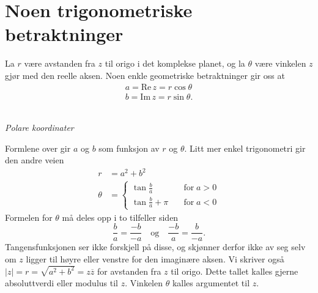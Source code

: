 \section*{Noen trigonometriske betraktninger}
La $r$ være avstanden fra $z$ til origo i det komplekse planet, og la $\theta$ være vinkelen $z$ gjør med den reelle aksen. Noen enkle geometriske betraktninger gir oss at 
\begin{align*}
a=\text{Re}\, z = r\cos \theta \\
b=\text{Im}\, z = r\sin \theta.
\end{align*}
\begin{center}
\\
{\small \textit{Polare koordinater}}
\end{center}
Formlene over gir $a$ og $b$ som funksjon av $r$ og $\theta$. Litt mer enkel trigonometri gir den andre veien
\begin{align*}
r&=a^2+b^2 \\
\theta&= \begin{cases} \tan \frac{b}{a} \quad &\text{for}\; a>0\\ \tan \frac{b}{a} + \pi \quad &\text{for}\;  a<0 \end{cases}
\end{align*}
Formelen for $\theta$ må deles opp i to tilfeller siden
\[
\frac{b}{a}=\frac{-b}{-a} \quad \text{og} \quad \frac{-b}{a}=\frac{b}{-a}.
\]
 Tangensfunksjonen ser ikke forskjell på disse, og skjønner derfor ikke av seg selv om $z$ ligger til høyre eller venstre for den imaginære aksen. Vi skriver også $|z|=r=\sqrt{a^2+b^2}=z\overline z$ for avstanden fra $z$ til origo. Dette tallet kalles gjerne absoluttverdi eller modulus til $z$. Vinkelen $\theta$ kalles argumentet til $z$.



